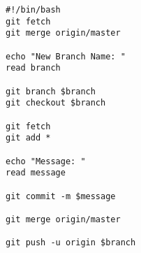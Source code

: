 \begin{verbatim}
#!/bin/bash
git fetch
git merge origin/master 

echo "New Branch Name: "
read branch

git branch $branch
git checkout $branch

git fetch
git add * 

echo "Message: "
read message

git commit -m $message

git merge origin/master

git push -u origin $branch
\end{verbatim}